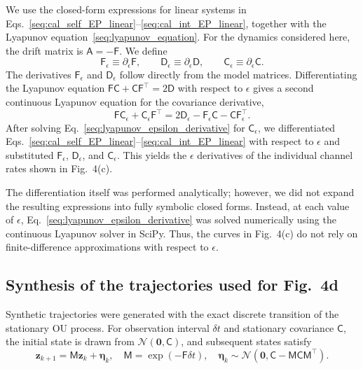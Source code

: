 \documentclass[
 longbibliography,
 twocolumn,
 superscriptaddress,
 amsmath,
 amssymb,
 amsthm,
 amsfonts,
 prl,
 floatfix,
]{revtex4-2}
\newcommand{\matbf}[1]{\boldsymbol{\mathsf{#1}}}
\begin{document}
\begin{widetext}
We use the closed-form expressions for linear systems in Eqs.~\eqref{seq:cal_self_EP_linear}--\eqref{seq:cal_int_EP_linear}, together with the Lyapunov equation~\eqref{seq:lyapunov_equation}. For the dynamics considered here, the drift matrix is $\matbf A=-\matbf F$. We define
\begin{equation}
    \matbf F_\epsilon \equiv \partial_\epsilon \matbf F,
    \qquad
    \matbf D_\epsilon \equiv \partial_\epsilon \matbf D,
    \qquad
    \matbf C_\epsilon \equiv \partial_\epsilon \matbf C.
\end{equation}
The derivatives $\matbf F_\epsilon$ and $\matbf D_\epsilon$ follow directly from the model matrices. Differentiating the Lyapunov equation $\matbf F\matbf C+\matbf C\matbf F^\intercal=2\matbf D$ with respect to $\epsilon$ gives a second continuous Lyapunov equation for the covariance derivative,
\begin{equation}
    \matbf F\matbf C_\epsilon
    +\matbf C_\epsilon\matbf F^\intercal
    =
    2\matbf D_\epsilon
    -\matbf F_\epsilon\matbf C
    -\matbf C\matbf F_\epsilon^\intercal.
    \label{seq:lyapunov_epsilon_derivative}
\end{equation}
After solving Eq.~\eqref{seq:lyapunov_epsilon_derivative} for $\matbf C_\epsilon$, we differentiated Eqs.~\eqref{seq:cal_self_EP_linear}--\eqref{seq:cal_int_EP_linear} with respect to $\epsilon$ and substituted $\matbf F_\epsilon$, $\matbf D_\epsilon$, and $\matbf C_\epsilon$. This yields the $\epsilon$ derivatives of the individual channel rates shown in Fig.~4(c).

The differentiation itself was performed analytically; however, we did not expand the resulting expressions into fully symbolic closed forms. Instead, at each value of $\epsilon$, Eq.~\eqref{seq:lyapunov_epsilon_derivative} was solved numerically using the continuous Lyapunov solver in SciPy. Thus, the curves in Fig.~4(c) do not rely on finite-difference approximations with respect to $\epsilon$.

\subsection{Synthesis of the trajectories used for Fig.~4d}
\vspace*{-0.6\baselineskip}

Synthetic trajectories were generated with the exact discrete transition of the stationary OU process. For observation interval $\delta t$ and stationary covariance $\matbf C$, the initial state is drawn from $\mathcal N(\bm 0,\matbf C)$, and subsequent states satisfy
\begin{equation}
    \bm z_{k+1}=\matbf M\bm z_k+\bm\eta_k,
    \quad
    \matbf M=\exp(-\matbf F\delta t),
    \quad
    \bm\eta_k\sim\mathcal N(\bm 0,\matbf C-\matbf M\matbf C\matbf M^\intercal).
    \label{seq:synthesis_trjs_equation}
\end{equation}


\end{widetext}
\end{document}
